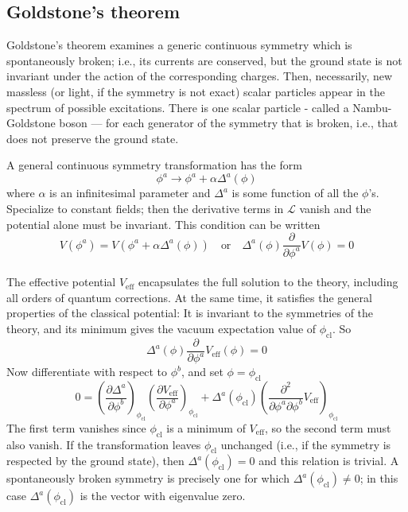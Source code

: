 \subsection{Goldstone's theorem}
\begin{newthem}
Goldstone's theorem examines a generic continuous symmetry which is spontaneously broken; i.e., its currents are conserved, but the ground state is not invariant under the action of the corresponding charges. Then, necessarily, new massless (or light, if the symmetry is not exact) scalar particles appear in the spectrum of possible excitations. There is one scalar particle - called a Nambu-Goldstone boson — for each generator of the symmetry that is broken, i.e., that does not preserve the ground state.
\end{newthem}

A general continuous symmetry transformation has the form
\[\phi^a \to \phi^a + \alpha \Delta^a (\phi)\]
where $\alpha$ is an infinitesimal parameter and $\Delta^a$ is some function of all the $\phi$'s. Specialize to constant fields; then the derivative terms in $\mathcal{L}$ vanish and the potential alone must be invariant. This condition can be written
\[V(\phi^a) = V(\phi^a + \alpha \Delta^a (\phi)) \quad \mbox{or} \quad \Delta^a(\phi) \frac{\partial}{\partial \phi^a} V(\phi) = 0\]\\

The effective potential $V_{\mathrm{eff}}$ encapsulates the full solution to the theory, including all orders of quantum corrections. At the same time, it satisfies the general properties of the classical potential: It is invariant to the symmetries of the theory, and its minimum gives the vacuum expectation value of $\phi_{\mathrm{cl}}$. So
\[\Delta^a(\phi) \frac{\partial}{\partial \phi^a} V_{\mathrm{eff}}(\phi) = 0\]
Now differentiate with respect to $\phi^b$, and set $\phi = \phi_{\mathrm{cl}}$
\[0 = \left( \frac{\partial \Delta^a}{\partial \phi^b} \right)_{\phi_{\mathrm{cl}}} \left( \frac{\partial V_{\mathrm{eff}}}{\partial \phi^a}\right)_{\phi_{\mathrm{cl}}} + \Delta^a(\phi_{\mathrm{cl}}) \left( \frac{\partial^2}{\partial \phi^a \partial \phi^b}V_{\mathrm{eff}}\right)_{\phi_{\mathrm{cl}}}\]
The first term vanishes since $\phi_{\mathrm{cl}}$ is a minimum of $V_{\mathrm{eff}}$, so the second term must also vanish. If the transformation leaves $\phi_{\mathrm{cl}}$ unchanged (i.e., if the symmetry is respected by the ground state), then $\Delta^a(\phi_{\mathrm{cl}})=0$ and this relation is trivial. A spontaneously broken symmetry is precisely one for which $\Delta^a(\phi_{\mathrm{cl}}) \neq 0$; in this
case $\Delta^a(\phi_{\mathrm{cl}})$ is the vector with eigenvalue zero.\\

